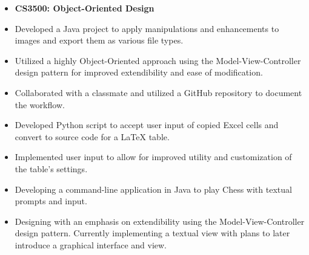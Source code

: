 \documentclass[10pt,a4paper,ragged2e,withhyper]{altacv}
\begin{document}
\begin{paracol}{2}
    \vspace{-2em}
    \begin{itemize}
        \item[] \textbf{CS3500: Object-Oriented Design}
        \item Developed a Java project to apply manipulations and enhancements to images and export them as various file types.
        \item Utilized a highly Object-Oriented approach using the Model-View-Controller design pattern for improved extendibility and ease of modification.
        \item Collaborated with a classmate and utilized a GitHub repository to document the workflow.
    \end{itemize}

    \begin{itemize}
        \item Developed Python script to accept user input of copied Excel cells and convert to source code for a LaTeX table.
        \item Implemented user input to allow for improved utility and customization of the table's settings.
    \end{itemize}

    \begin{itemize}
        \item Developing a command-line application in Java to play Chess with textual prompts and input.
        \item Designing with an emphasis on extendibility using the Model-View-Controller design pattern. Currently implementing a textual view with plans to later introduce a graphical interface and view.
    \end{itemize}



\end{paracol}
\end{document}
